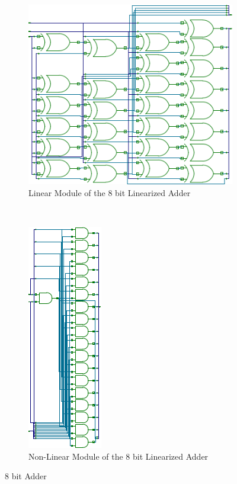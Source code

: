 \documentclass{article}
\begin{document}
\begin{figure}[p]
        \centering
        \begin{subfigure}[b]{0.5\textwidth}
                \includegraphics[scale=0.8]{pic_L.png}
                \caption{Linear Module of the 8 bit Linearized Adder}
                \label{fig:pic_lin}
        \end{subfigure}
        ~
        \begin{subfigure}[b]{0.5\textwidth}
                \includegraphics[scale=0.8]{pic_NL.png}
                \caption{Non-Linear Module of the 8 bit Linearized Adder}
                \label{fig:pic_nonlin}
        \end{subfigure}
        \caption{8 bit Adder}
        \label{fig:pic}
\end{figure}




\newpage



\end{document}
